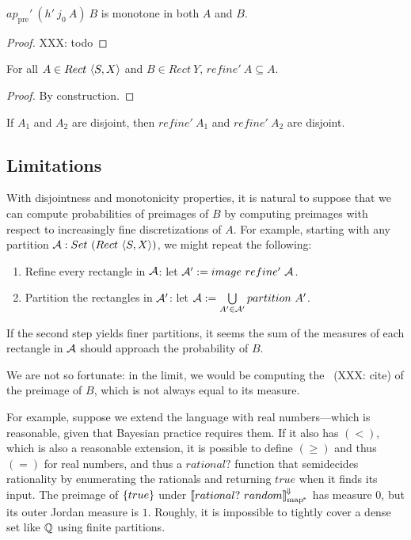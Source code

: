 \documentclass[preprint]{sigplanconf}
\newcommand{\conv}{^{\mspace{-2mu}\Downarrow\mspace{-2mu}}}
\newcommand{\pre}{_\mathrm{pre}}
\newcommand{\pmap}{_\mathrm{map^{\mspace{-2mu}*}}}
\begin{document}
\begin{theorem}[monotonicity]
$ap\pre'~(h'~j_0~A)~B$ is monotone in both $A$ and $B$.
\end{theorem}
\begin{proof}
XXX: todo
\end{proof}

\begin{theorem}
For all $A \in Rect~\langle{S,X}\rangle$ and $B \in Rect~Y$, $refine'~A \subseteq A$.
\end{theorem}
\begin{proof}
By construction.
\end{proof}


\begin{corollary}
If $A_1$ and $A_2$ are disjoint, then $refine'~A_1$ and $refine'~A_2$ are disjoint.
\end{corollary}

\subsection{Limitations}
\label{sec:discretization}

With disjointness and monotonicity properties, it is natural to suppose that we can compute probabilities of preimages of $B$ by computing preimages with respect to increasingly fine discretizations of $A$.
For example, starting with any partition $\mathcal{A} : Set~(Rect~\langle{S,X}\rangle)$, we might repeat the following:
\begin{enumerate}
	\item Refine every rectangle in $\mathcal{A}$: let $\mathcal{A}' := image~refine'~\mathcal{A}$.
	\item Partition the rectangles in $\mathcal{A}'$: let $\mathcal{A} := \bigcup\limits_{A' \in \mathcal{A}'} partition~A'$.
\end{enumerate}
If the second step yields finer partitions, it seems the sum of the measures of each rectangle in $\mathcal{A}$ should approach the probability of $B$.

We are not so fortunate: in the limit, we would be computing the ~(XXX: cite) of the preimage of $B$, which is not always equal to its measure.

For example, suppose we extend the language with real numbers---which is reasonable, given that Bayesian practice requires them.
If it also has $(<)$, which is also a reasonable extension, it is possible to define $(\ge)$ and thus $(=)$ for real numbers, and thus a $rational?$ function that semidecides rationality by enumerating the rationals and returning $true$ when it finds its input.
The preimage of $\{{true}\}$ under $\meaningof{rational?~random}\pmap\conv$ has measure $0$, but its outer Jordan measure is $1$.
Roughly, it is impossible to tightly cover a dense set like $\mathbb{Q}$ using finite partitions.
\end{document}
